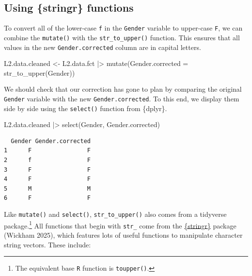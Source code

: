 \documentclass[
  letterpaper,
  DIV=11,
  numbers=noendperiod]{scrreprt}
\newenvironment{Shaded}{\begin{snugshade}}{\end{snugshade}}
\newcommand{\AttributeTok}[1]{\textcolor[rgb]{0.40,0.45,0.13}{#1}}
\newcommand{\FunctionTok}[1]{\textcolor[rgb]{0.28,0.35,0.67}{#1}}
\newcommand{\NormalTok}[1]{\textcolor[rgb]{0.00,0.23,0.31}{#1}}
\newcommand{\OtherTok}[1]{\textcolor[rgb]{0.00,0.23,0.31}{#1}}
\newcommand{\SpecialCharTok}[1]{\textcolor[rgb]{0.37,0.37,0.37}{#1}}
\begin{document}
\subsection{\texorpdfstring{Using \{stringr\}
functions~}{Using \{stringr\} functions~}}\label{sec-stringR}

To convert all of the lower-case \texttt{f} in the \texttt{Gender}
variable to upper-case \texttt{F}, we can combine the \texttt{mutate()}
with the \texttt{str\_to\_upper()} function. This ensures that all
values in the new \texttt{Gender.corrected} column are in capital
letters.

\begin{Shaded}
\begin{Highlighting}[]
\NormalTok{L2.data.cleaned }\OtherTok{\textless{}{-}}\NormalTok{ L2.data.fct }\SpecialCharTok{|\textgreater{}} 
  \FunctionTok{mutate}\NormalTok{(}\AttributeTok{Gender.corrected =} \FunctionTok{str\_to\_upper}\NormalTok{(Gender))}
\end{Highlighting}
\end{Shaded}

We should check that our correction has gone to plan by comparing the
original \texttt{Gender} variable with the new
\texttt{Gender.corrected}. To this end, we display them side by side
using the \texttt{select()} function from \{dplyr\}.

\begin{Shaded}
\begin{Highlighting}[]
\NormalTok{L2.data.cleaned }\SpecialCharTok{|\textgreater{}} 
  \FunctionTok{select}\NormalTok{(Gender, Gender.corrected)}
\end{Highlighting}
\end{Shaded}

\begin{verbatim}
  Gender Gender.corrected
1      F                F
2      f                F
3      F                F
4      F                F
5      M                M
6      F                F
\end{verbatim}

Like \texttt{mutate()} and \texttt{select()}, \texttt{str\_to\_upper()}
also comes from a tidyverse package.\footnote{The equivalent base
  \texttt{R} function is \texttt{toupper()}.} All functions that begin
with \texttt{str\_} come from the
\href{https://stringr.tidyverse.org/}{\{stringr\}} package (Wickham
2025), which features lots of useful functions to manipulate character
string vectors. These include:
\end{document}
